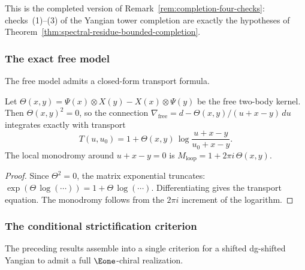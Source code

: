 This is the completed version of
Remark~\ref{rem:completion-four-checks}: checks~(1)--(3)
of the Yangian tower completion are exactly the hypotheses of
Theorem~\ref{thm:spectral-residue-bounded-completion}.

\subsubsection{The exact free model}

The free model admits a closed-form transport formula.

\begin{proposition}
\label{prop:spectral-exact-free-transport}
Let $\Theta(x,y) = \Psi(x) \otimes X(y) - X(x) \otimes \Psi(y)$
be the free two-body kernel.
Then $\Theta(x,y)^2 = 0$, so the connection
$\nabla_{\mathrm{free}} = d - \Theta(x,y)/(u + x - y)\,du$
integrates exactly with transport
\[
 T(u,u_0)
 = 1 + \Theta(x,y)\,\log\frac{u + x - y}{u_0 + x - y}.
\]
The local monodromy around $u + x - y = 0$ is
$M_{\mathrm{loop}} = 1 + 2\pi i\,\Theta(x,y)$.
\end{proposition}

\begin{proof}
Since $\Theta^2 = 0$, the matrix exponential truncates:
$\exp(\Theta\,\log(\cdots)) = 1 + \Theta\,\log(\cdots)$.
Differentiating gives the transport equation. The monodromy
follows from the $2\pi i$ increment of the logarithm.
\end{proof}

\subsubsection{The conditional strictification criterion}

The preceding results assemble into a single criterion for
a shifted dg-shifted Yangian to admit a full $\Eone$-chiral
realization.


